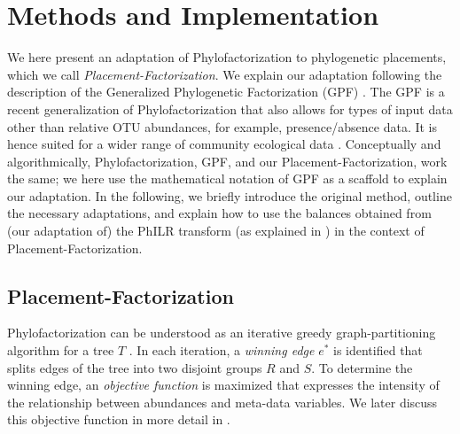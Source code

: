 \section{Methods and Implementation}
\label{ch:Factorization:sec:Methods}

We here present an adaptation of Phylofactorization to phylogenetic placements, which we call \emph{Placement-Factorization}.
We explain our adaptation following the description of the Generalized Phylogenetic Factorization (GPF) \cite{Washburne2018,Washburne2019}.
The GPF is a recent generalization of Phylofactorization
that also allows for types of input data other than relative OTU abundances, for example, presence/absence data.
It is hence suited for a wider range of community ecological data \cite{Washburne2019}.
Conceptually and algorithmically, Phylofactorization, GPF, and our Placement-Factorization, work the same;
we here use the mathematical notation of GPF as a scaffold to explain our adaptation.
In the following, we briefly introduce the original method, outline the necessary adaptations,
and explain how to use the balances obtained from (our adaptation of)
the PhILR transform (as explained in ) in the context of Placement-Factorization.


\subsection{Placement-Factorization}
\label{sec:Factorization:sub:Methods:sub:Phylofactor}

Phylofactorization can be understood as an iterative greedy graph-partitioning algorithm for a tree $T$ \cite{Washburne2018}.
In each iteration, a \emph{winning edge} $e^*$ is identified
that splits edges of the tree into two disjoint groups $R$ and $S$.
To determine the winning edge, an \emph{objective function} is maximized
that expresses the intensity of the relationship between abundances and meta-data variables.
We later discuss this objective function in more detail in .



